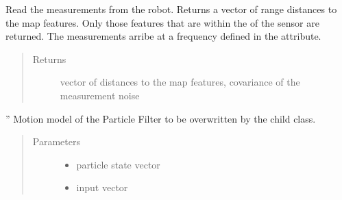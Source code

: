 \documentclass[letterpaper,10pt,english]{sphinxmanual}
\begin{document}
\begin{fulllineitems}
\begin{fulllineitems}
\end{fulllineitems}


\begin{fulllineitems}
\label{\detokenize{particle_filter:PF_3DOF_MBL.PF_3DOF_MBL.GetMeasurements}}
\sphinxAtStartPar
Read the measurements from the robot. Returns a vector of range distances to the map features.
Only those features that are within the  of the sensor are returned.
The measurements arribe at a frequency defined in the  attribute.
\begin{quote}\begin{description}
\item[{Returns}] \leavevmode
\sphinxAtStartPar
vector of distances to the map features, covariance of the measurement noise

\end{description}\end{quote}

\end{fulllineitems}


\begin{fulllineitems}
\label{\detokenize{particle_filter:PF_3DOF_MBL.PF_3DOF_MBL.MotionModel}}
\sphinxAtStartPar
”
Motion model of the Particle Filter to be overwritten by the child class.
\begin{quote}\begin{description}
\item[{Parameters}] \leavevmode\begin{itemize}
\item {} 
\sphinxAtStartPar
{} \textendash{} particle state vector

\item {} 
\sphinxAtStartPar
{} \textendash{} input vector


\end{itemize}
\end{description}
\end{quote}
\end{fulllineitems}
\end{fulllineitems}
\end{document}
